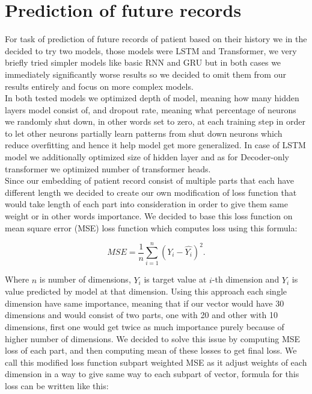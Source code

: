 
\section{Prediction of future records}
\label{recordPredImple}

For task of prediction of future records of patient based on their history we in the decided to try two models, those models were LSTM and Transformer, we very briefly tried simpler models like basic RNN and GRU but in both cases we immediately significantly worse results so we decided to omit them from our results entirely and focus on more complex models.
\\

In both tested models we optimized depth of model, meaning how many hidden layers model consist of, and dropout rate, meaning what percentage of neurons we randomly shut down, in other words set to zero, at each training step in order to let other neurons partially learn patterns from shut down neurons which reduce overfitting and hence it help model get more generalized. In case of LSTM model we additionally optimized size of hidden layer and as for Decoder-only transformer we optimized number of transformer heads.
\\  

Since our embedding of patient record consist of multiple parts that each have different length we decided to create our own modification of loss function that would take length of each part into consideration in order to give them same weight or in other words importance. We decided to base this loss function on mean square error (MSE) loss function which computes loss using this formula:

\begin{equation}
	\label{eqn:mse}
	MSE = \frac{1}{n}\sum_{i=1}^{n}(Y_i-\hat{Y_i})^2.
\end{equation} 

Where $n$ is number of dimensions, $Y_i$ is target value at $i$-th dimension and $\hat{Y_i}$ is value predicted by model at that dimension. Using this approach each single dimension have same importance, meaning that if our vector would have 30 dimensions and would consist of two parts, one with 20 and other with 10 dimensions, first one would get twice as much importance purely because of higher number of dimensions. We decided to solve this issue by computing MSE loss of each part, and then computing mean of these losses to get final loss. We call this modified loss function subpart weighted MSE as it adjust weights of each dimension in a way to give same way to each subpart of vector, formula for this loss can be written like this:

